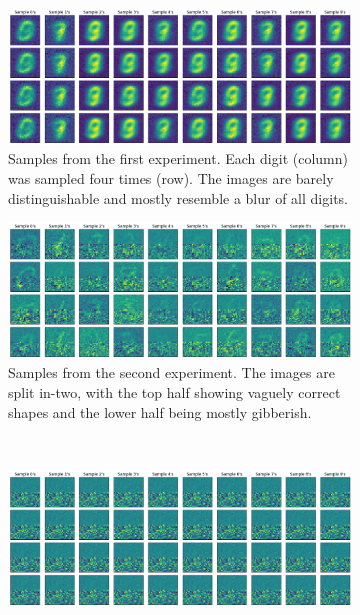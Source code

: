 \begin{figure}
\centering
\begin{subfigure}[t]{0.45\textwidth}
    \includegraphics[width=\textwidth]{images/mnist_maxpooling/run_1_samples.png}
    \caption{\footnotesize Samples from the first experiment. Each digit (column) was sampled four times (row). The images are barely distinguishable and mostly resemble a blur of all digits.}
    \label{fig:mnist_run_1_samples}
\end{subfigure}
\hfill
\begin{subfigure}[t]{0.45\textwidth}
    \includegraphics[width=\textwidth]{images/mnist_maxpooling/run_2_samples.png}
    \caption{\footnotesize Samples from the second experiment. The images are split in-two, with the top half showing vaguely correct shapes and the lower half being mostly gibberish.}
    \label{fig:mnist_run_2_samples}
\end{subfigure}\\
\vspace{.5em}
\begin{subfigure}[t]{0.45\textwidth}
    \includegraphics[width=\textwidth]{images/mnist_maxpooling/run_3_samples.png}

\end{subfigure}
\end{figure}

